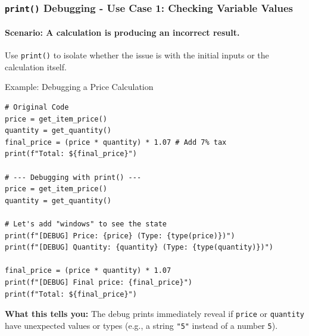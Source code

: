 \documentclass{beamer}
\begin{document}
\begin{frame}[fragile]
    \frametitle{\texttt{print()} Debugging - Use Case 1: Checking Variable Values}
    \framesubtitle{Scenario: A calculation is producing an incorrect result.}
    \vspace{1em}
    Use \texttt{print()} to isolate whether the issue is with the initial inputs or the calculation itself.

    \begin{block}{Example: Debugging a Price Calculation}
        \begin{verbatim}
# Original Code
price = get_item_price()
quantity = get_quantity()
final_price = (price * quantity) * 1.07 # Add 7% tax
print(f"Total: ${final_price}")

# --- Debugging with print() ---
price = get_item_price()
quantity = get_quantity()

# Let's add "windows" to see the state
print(f"[DEBUG] Price: {price} (Type: {type(price)})")
print(f"[DEBUG] Quantity: {quantity} (Type: {type(quantity)})")

final_price = (price * quantity) * 1.07
print(f"[DEBUG] Final price: {final_price}")
print(f"Total: ${final_price}")
        \end{verbatim}
    \end{block}

    \textbf{What this tells you:} The debug prints immediately reveal if \texttt{price} or \texttt{quantity} have unexpected values or types (e.g., a string \texttt{"5"} instead of a number \texttt{5}).

\end{frame}
\end{document}
